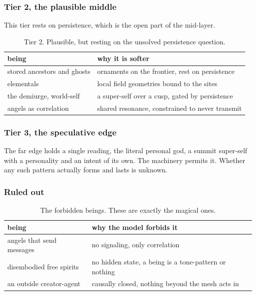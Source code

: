 \subsubsection{Tier 2, the plausible middle}

This tier rests on persistence, which is the open part of the mid-layer.

\begin{table}[ht]
\centering
\begin{tabular}{@{}ll@{}}
\toprule
being & why it is softer \\
\midrule
stored ancestors and ghosts & ornaments on the frontier, rest on persistence \\
elementals & local field geometries bound to the sites \\
the demiurge, world-self & a super-self over a cusp, gated by persistence \\
angels as correlation & shared resonance, constrained to never transmit \\
\bottomrule
\end{tabular}
\caption{Tier 2. Plausible, but resting on the unsolved persistence question.}
\label{tab:being-tier2}
\end{table}

\subsubsection{Tier 3, the speculative edge}

The far edge holds a single reading, the literal personal god, a summit super-self with a personality and an intent of its own. The machinery permits it. Whether any such pattern actually forms and lasts is unknown.

\subsubsection{Ruled out}

\begin{table}[ht]
\centering
\begin{tabular}{@{}ll@{}}
\toprule
being & why the model forbids it \\
\midrule
angels that send messages & no signaling, only correlation \\
disembodied free spirits & no hidden state, a being is a tone-pattern or nothing \\
an outside creator-agent & causally closed, nothing beyond the mesh acts in \\
\bottomrule
\end{tabular}
\caption{The forbidden beings. These are exactly the magical ones.}
\label{tab:being-ruled-out}
\end{table}


